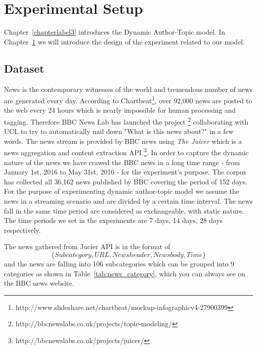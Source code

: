 \chapter{Experimental Setup}
\label{chapterlabel4}

Chapter~\ref{chapterlabel3} introduces the Dynamic Author-Topic model. In Chapter~\ref{chapterlabel4} we will introduce the design of the experiment related to our model. 



\section{Dataset}\label{dataset}
News is the contemporary witnesses of the world and tremendous number of news are generated every day. According to Chartbeat\footnote{http://www.slideshare.net/chartbeat/mockup-infographicv4-27900399}, over 92,000 news are posted to the web every 24 hours which is nearly impossible for human processing and tagging. Therefore BBC News Lab has launched the project \footnote{http://bbcnewslabs.co.uk/projects/topic-modeling/} collaborating with UCL to try to automatically nail down "What is this news about?" in a few words. 
The news stream is provided by BBC news using \textit{The Juicer} which is a news aggregation and content extraction API \footnote{http://bbcnewslabs.co.uk/projects/juicer/}. In order to capture the dynamic nature of the news we have crawed the BBC news in a long time range - from January 1st, 2016 to May 31st, 2016 - for the experiment's purpose.
The corpus has collected all 36,162 news published by BBC covering the period of 152 days. For the purpose of experimenting dynamic author-topic model we assume the news in a streaming scenario and are divided by a certain time interval. The news fall in the same time period are considered as exchangeable, with static nature. The time periods we set in the experiments are 7 days, 14 days, 28 days respectively. 

The news gathered from Jucier API is in the format of 
\begin{equation}\label{apiformat}
\{Subcategory, URL, News header, News body, Time\}
\end{equation}
and the news are falling into 106 subcategories which can be grouped into 9 categories as shown in Table~\ref{tab:news_category}, which you can always see on the BBC news website. 

